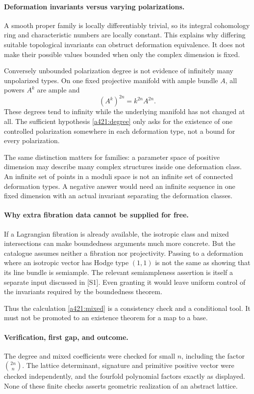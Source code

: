 \documentclass[11pt]{article}
\begin{document}
\paragraph{Deformation invariants versus varying polarizations.}
A smooth proper family is locally differentiably
trivial, so its integral cohomology ring and
characteristic numbers are locally constant.
This explains why differing suitable topological
invariants can obstruct deformation equivalence.
It does not make their possible values bounded
when only the complex dimension is fixed.

Conversely unbounded polarization degree is not
evidence of infinitely many unpolarized types.
On one fixed projective manifold with ample
bundle $A$, all powers $A^k$ are ample and
\[
                         (A^k)^{2n}=k^{2n}A^{2n}.
\]
These degrees tend to infinity while the
underlying manifold has not changed at all.
The sufficient hypothesis
\eqref{a421:degree} only asks for the
existence of one controlled polarization
somewhere in each deformation type, not
a bound for every polarization.

The same distinction matters for families:
a parameter space of positive dimension
may describe many complex structures
inside one deformation class. An infinite
set of points in a moduli space is not
an infinite set of connected deformation
types. A negative answer would need an
infinite sequence in one fixed dimension
with an actual invariant separating the
deformation classes.

\paragraph{Why extra fibration data cannot be supplied for free.}
If a Lagrangian fibration is already available,
the isotropic class and mixed intersections
can make boundedness arguments much more
concrete. But the catalogue assumes neither
a fibration nor projectivity. Passing to
a deformation where an isotropic vector
has Hodge type $(1,1)$ is not the same as
showing that its line bundle is semiample.
The relevant semiampleness assertion is
itself a separate input discussed in [S1].
Even granting it would leave uniform
control of the invariants required by the
boundedness theorem.

Thus the calculation \eqref{a421:mixed}
is a consistency check and a conditional
tool. It must not be promoted to an
existence theorem for a map to a base.

\paragraph{Verification, first gap, and outcome.}
The degree and mixed coefficients were checked
for small $n$, including the factor
$\binom{2n}{n}$. The lattice determinant,
signature and primitive positive vector
were checked independently, and the
fourfold polynomial factors exactly as
displayed. None of these finite checks
asserts geometric realization of an
abstract lattice.
\end{document}
